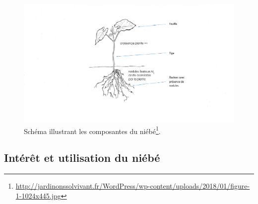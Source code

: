 \documentclass[a4paper,11pt]{article}
\begin{document}
\begin{figure}%
  \begin{center}
   \includegraphics[width=18cm]{images/SchemaDescriptifNiebe}
  \end{center}
  \caption{Schéma illustrant les composantes du niébé\protect\footnote{\protect\url{http://jardinonssolvivant.fr/WordPress/wp-content/uploads/2018/01/figure-1-1024x445.jpg}}.}
\end{figure}


\subsection{Intérêt et utilisation du niébé}
\end{document}

